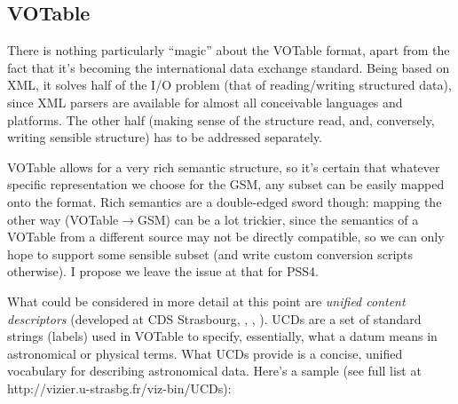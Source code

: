 \documentclass[]{lofar}
\begin{document}
\subsection{VOTable}
  
  There is nothing particularly ``magic'' about the VOTable format, apart from
  the fact that it's becoming the international data exchange standard. Being
  based on XML, it solves half of the I/O problem (that of reading/writing
  structured data), since XML parsers are available for almost all conceivable
  languages and platforms. The other half (making sense of the structure read,
  and, conversely, writing sensible structure) has to be addressed separately.
  
  VOTable allows for a very rich semantic structure, so it's certain that
  whatever specific representation we choose for the GSM, any subset can be
  easily mapped onto the format. Rich semantics are a double-edged sword though:
  mapping the other way (VOTable$\rightarrow$GSM) can be a lot trickier, since
  the  semantics of a VOTable from a different source may not be directly
  compatible, so we can only hope to support some sensible subset (and write
  custom conversion scripts otherwise). I propose we leave the issue at that for
  PSS4.
  
  What could be considered in more detail at this point are {\em unified content
  descriptors} (developed at CDS Strasbourg, \cite{UCD1}, \cite{UCD2},
  \cite{UCD3}). UCDs are a set of standard strings (labels) used in VOTable to
  specify, essentially, what a datum means in astronomical or physical terms.
  What UCDs provide is a concise, unified vocabulary for describing astronomical
  data. Here's a sample (see full list at
  http://vizier.u-strasbg.fr/viz-bin/UCDs):
  
\end{document}
